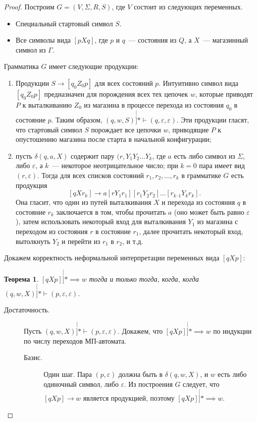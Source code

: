 \documentclass[a4paper,12pt]{article}
\newtheorem*{theorem}{Теорема}
\begin{document}
\begin{proof}
	Построим \(G = (V, \Sigma, R, S)\), где \(V\) состоит из следующих переменных.
	\begin{itemize}
		\item Специальный стартовый символ \(S\).
		\item Все символы вида \([pXq]\), где \(p\) и \(q\)~--- состояния из \(Q\), а \(X\)~--- магазинный символ из \(\Gamma\).
	\end{itemize}
	Грамматика \(G\) имеет следующие продукции:
	\begin{enumerate}
		\item Продукции \(S \to [q_0 Z_0 p]\) для всех состояний \(p\). Интуитивно символ вида \([q_0 Z_0 p]\) предназначен для порождения всех тех цепочек \(w\), которые приводят \(P\) к выталкиванию \(Z_0\) из магазина в процессе перехода из состояния \(q_0\) в состояние \(p\). Таким образом, \((q, w, S) \stackrel[]{*}{\vdash} (q, \varepsilon, \varepsilon)\). Эти продукции гласят, что стартовый символ \(S\) порождает все цепочки \(w\), приводящие \(P\) к опустошению магазина после старта в начальной конфигурации;
		
		\item пусть \(\delta(q, a, X)\) содержит пару \((r, Y_1 Y_2 \ldots Y_k\), где \(a\) есть либо символ из \(\Sigma\), либо \(\varepsilon\), а \(k\)~--- некоторое неотрицательное число; при \(k = 0\) пара имеет вид \((r, \varepsilon)\). Тогда для всех списков состояний \(r_1, r_2, \ldots, r_k\) в грамматике \(G\) есть продукция \[[q X r_k] \to a[r Y_1 r_1][r_1 Y_2 r_2]...[r_{k–1} Y_k r_k].\]
		Она гласит, что один из путей выталкивания \(X\) и перехода из состояния \(q\) в состояние \(r_k\) заключается в том, чтобы прочитать \(a\) (оно может быть равно \(\varepsilon\)), затем использовать некоторый вход для выталкивания \(Y_1\) из магазина с переходом из состояния \(r\) в состояние \(r_1\), далее прочитать некоторый вход, вытолкнуть \(Y_2\) и перейти из \(r_1\) в \(r_2\), и т.д.
	\end{enumerate}
	Докажем корректность неформальной интерпретации переменных вида \([qXp]\):
	\begin{theorem}
		\([qXp] \stackrel[]{*}{\implies} w\) тогда и только тогда, когда, когда \((q, w, X) \stackrel[]{*}{\vdash} (p, \varepsilon, \varepsilon)\).
	\end{theorem}
	\begin{description}
		\item[Достаточность.] Пусть \((q, w, X) \stackrel[]{*}{\vdash} (p, \varepsilon, \varepsilon)\). Докажем, что \([qXp] \stackrel[]{*}{\implies} w\) по индукции по числу переходов МП-автомата.
		\begin{description}
			\item[Базис.] Один шаг. Пара \((p, \varepsilon)\) должна быть в \(\delta(q, w, X)\), и \(w\) есть либо одиночный символ, либо \(\varepsilon\). Из построения \(G\) следует, что \([qXp] \to w\) является продукцией, поэтому \([qXp] \stackrel[]{*}{\implies} w\).
			

\end{description}
\end{description}
\end{proof}
\end{document}
